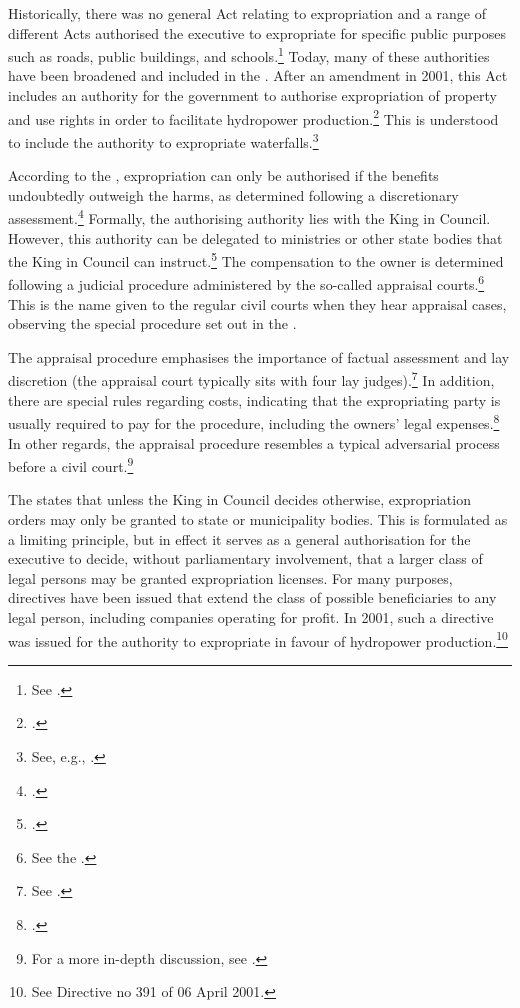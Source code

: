 Historically, there was no general Act relating to expropriation and a range of different Acts authorised the executive to expropriate for specific public purposes such as roads, public buildings, and schools.\footnote{See \cite[11-12]{nut54}.} Today, many of these authorities have been broadened and included in the \cite{ea59}. After an amendment in 2001, this Act includes an authority for the government to authorise expropriation of property and use rights in order to facilitate hydropower production.\dni\footcite[2 no 51]{ea59} This is understood to include the authority to expropriate waterfalls.\footnote{See, e.g., 
\cite{sauda07}.}

According to the \cite{ea59}, expropriation can only be authorised if the benefits undoubtedly outweigh the harms, as determined following a discretionary assessment.\footnote{\dni\cite[2]{ea59}.} Formally, the authorising authority lies with the King in Council. However, this authority can be delegated to ministries or other state bodies that the King in Council can instruct.\footnote{\dni\cite[5]{ea59}.} The compensation to the owner is determined following a judicial procedure administered by the so-called appraisal courts.\footnote{See the \dni\cite[2]{ea59}.} This is the name given to the regular civil courts when they hear appraisal cases, observing the special procedure set out in the \cite{aa17}. 

The appraisal procedure emphasises the importance of factual assessment and lay discretion (the appraisal court typically sits with four lay judges).\footnote{See \dni\cite[11-12]{aa17}.} In addition, there are special rules regarding costs, indicating that the expropriating party is usually required to pay for the procedure, including the owners' legal expenses.\footnote{\dni\cite[54]{aa17}.} In other regards, the appraisal procedure resembles a typical adversarial process before a civil court.\footnote{For a more in-depth discussion, see \cite[382-384]{dyrkolbotn15b}.}

The \cite{ea59} states that unless the King in Council decides otherwise, expropriation orders may only be granted to state or municipality bodies. This is formulated as a limiting principle, but in effect it serves as a general authorisation for the executive to decide, without parliamentary involvement, that a larger class of legal persons may be granted expropriation licenses. For many purposes, directives have been issued that extend the class of possible beneficiaries to any legal person, including companies operating for profit. In 2001, such a directive was issued for the authority to expropriate in favour of hydropower production.\footnote{See Directive no 391 of 06 April 2001.} 

